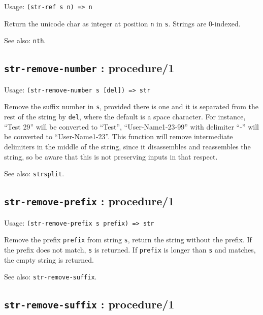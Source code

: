 \documentclass[
]{article}
\newcommand{\passthrough}[1]{#1}
\begin{document}
Usage: \passthrough{\lstinline!(str-ref s n) => n!}

Return the unicode char as integer at position
\passthrough{\lstinline!n!} in \passthrough{\lstinline!s!}. Strings are
0-indexed.

See also: \passthrough{\lstinline!nth!}.

\hypertarget{str-remove-number-procedure1-1}{%
\subsection{\texorpdfstring{\texttt{str-remove-number} :
procedure/1}{str-remove-number : procedure/1}}\label{str-remove-number-procedure1-1}}

Usage: \passthrough{\lstinline!(str-remove-number s [del]) => str!}

Remove the suffix number in \passthrough{\lstinline!s!}, provided there
is one and it is separated from the rest of the string by
\passthrough{\lstinline!del!}, where the default is a space character.
For instance, ``Test 29'' will be converted to ``Test'',
``User-Name1-23-99'' with delimiter ``-'' will be converted to
``User-Name1-23''. This function will remove intermediate delimiters in
the middle of the string, since it disassembles and reassembles the
string, so be aware that this is not preserving inputs in that respect.

See also: \passthrough{\lstinline!strsplit!}.

\hypertarget{str-remove-prefix-procedure1-1}{%
\subsection{\texorpdfstring{\texttt{str-remove-prefix} :
procedure/1}{str-remove-prefix : procedure/1}}\label{str-remove-prefix-procedure1-1}}

Usage: \passthrough{\lstinline!(str-remove-prefix s prefix) => str!}

Remove the prefix \passthrough{\lstinline!prefix!} from string
\passthrough{\lstinline!s!}, return the string without the prefix. If
the prefix does not match, \passthrough{\lstinline!s!} is returned. If
\passthrough{\lstinline!prefix!} is longer than
\passthrough{\lstinline!s!} and matches, the empty string is returned.

See also: \passthrough{\lstinline!str-remove-suffix!}.

\hypertarget{str-remove-suffix-procedure1-1}{%
\subsection{\texorpdfstring{\texttt{str-remove-suffix} :
procedure/1}{str-remove-suffix : procedure/1}}\label{str-remove-suffix-procedure1-1}}
\end{document}
